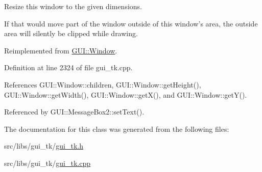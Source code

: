 Resize this window to the given dimensions. 

If that would move part of the window outside of this window's area, the outside area will silently be clipped while drawing. 

Reimplemented from \hyperlink{classGUI_1_1Window_a274ad6d6e68c94b165aa58700759f418}{G\-U\-I\-::\-Window}.



Definition at line 2324 of file gui\-\_\-tk.\-cpp.



References G\-U\-I\-::\-Window\-::children, G\-U\-I\-::\-Window\-::get\-Height(), G\-U\-I\-::\-Window\-::get\-Width(), G\-U\-I\-::\-Window\-::get\-X(), and G\-U\-I\-::\-Window\-::get\-Y().



Referenced by G\-U\-I\-::\-Message\-Box2\-::set\-Text().



The documentation for this class was generated from the following files\-:\begin{DoxyCompactItemize}
\item 
src/libs/gui\-\_\-tk/\hyperlink{gui__tk_8h}{gui\-\_\-tk.\-h}\item 
src/libs/gui\-\_\-tk/\hyperlink{gui__tk_8cpp}{gui\-\_\-tk.\-cpp}\end{DoxyCompactItemize}
